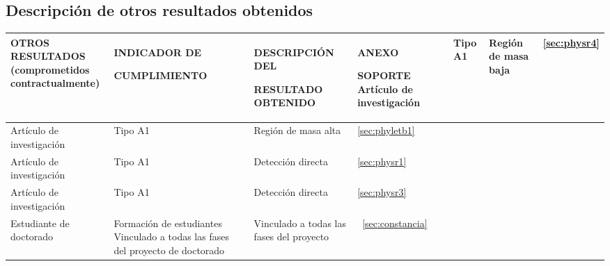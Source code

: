 \begin{landscape}
  \subsection{Descripción de otros resultados obtenidos}

\hspace{-1cm}  \begin{longtable}{|p{}|p{}|p{}|p{}|}\hline
 \parbox[t]{0.23\textwidth}{\centering OTROS RESULTADOS\\ (comprometidos\\ contractualmente)} &
\centering  INDICADOR DE \par
CUMPLIMIENTO &\centering DESCRIPCIÓN DEL \par
RESULTADO OBTENIDO   &\centering ANEXO\par SOPORTE\endhead\hline
Artículo de investigación&Tipo A1 &Región de masa baja \cite{Calle:2018ovc}  &
\ref{sec:physr4}\\\hline
Artículo de investigación&Tipo A1 &Región de masa alta \cite{Reig:2018ztc} &\ref{sec:phyletb1}\\\hline
Artículo de investigación&Tipo A1 &Detección directa \cite{Reig:2018mdk}  &\ref{sec:physr1}\\\hline
Artículo de investigación&Tipo A1 &Detección directa \cite{Bernal:2018aon} &\ref{sec:physr3}\\\hline
Estudiante de doctorado  &Formación de estudiantes Vinculado a todas las fases del proyecto de doctorado   & Vinculado a todas las fases del proyecto&~\ref{sec:constancia}\\\hline
  \end{longtable}
  

\end{landscape}
